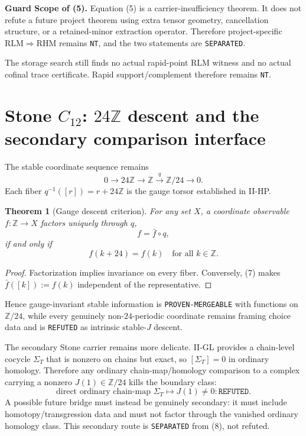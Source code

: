\documentclass[10pt,a4paper]{article}
\newcommand{\NT}{\texttt{NT}}
\newcommand{\REF}{\texttt{REFUTED}}
\newcommand{\SEP}{\texttt{SEPARATED}}
\newcommand{\PM}{\texttt{PROVEN-MERGEABLE}}
\newcommand{\Z}{\mathbb Z}
\newtheorem{theorem}{Theorem}
\newenvironment{guard}[1][]{\par\smallskip\noindent\begin{minipage}{0.97\linewidth}\small\textbf{Guard #1. }}{\end{minipage}\par\smallskip}
\begin{document}
\begin{guard}[Scope of (5)]
Equation (5) is a carrier-insufficiency theorem.  It does not refute a future project theorem using extra tensor geometry, cancellation structure, or a retained-minor extraction operator.  Therefore project-specific $\mathrm{RLM}\Rightarrow\mathrm{RHM}$ remains \NT, and the two statements are \SEP.
\end{guard}

The storage search still finds no actual rapid-point RLM witness and no actual cofinal trace certificate.  Rapid support/complement therefore remains \NT.

\section{\texorpdfstring{Stone $C_{12}$: $24\Z$ descent and the secondary comparison interface}{Stone C12: 24Z descent and the secondary comparison interface}}
The stable coordinate sequence remains
\[
0\longrightarrow24\Z\longrightarrow\Z\xrightarrow{q}\Z/24\longrightarrow0.
\tag{6}
\]
Each fiber $q^{-1}([r])=r+24\Z$ is the gauge torsor established in II-HP.

\begin{theorem}[Gauge descent criterion]
For any set $X$, a coordinate observable $f:\Z\to X$ factors uniquely through $q$,
\[
f=\bar f\circ q,
\]
if and only if
\[
\boxed{f(k+24)=f(k)\quad\text{for all }k\in\Z.}
\tag{7}
\]
\end{theorem}
\begin{proof}
Factorization implies invariance on every fiber.  Conversely, (7) makes $\bar f([k]):=f(k)$ independent of the representative.
\end{proof}

Hence gauge-invariant stable information is \PM{} with functions on $\Z/24$, while every genuinely non-$24$-periodic coordinate remains framing choice data and is \REF{} as intrinsic stable-$J$ descent.

The secondary Stone carrier remains more delicate.  II-GL provides a chain-level cocycle $\Sigma_T$ that is nonzero on chains but exact, so $[\Sigma_T]=0$ in ordinary homology.  Therefore any ordinary chain-map/homology comparison to a complex carrying a nonzero $J(1)\in\Z/24$ kills the boundary class:
\[
\boxed{
\text{direct ordinary chain-map }\Sigma_T\mapsto J(1)\ne0:\REF.
}
\tag{8}
\]
A possible future bridge must instead be genuinely secondary: it must include homotopy/transgression data and must not factor through the vanished ordinary homology class.  This secondary route is \SEP{} from (8), not refuted.
\end{document}
